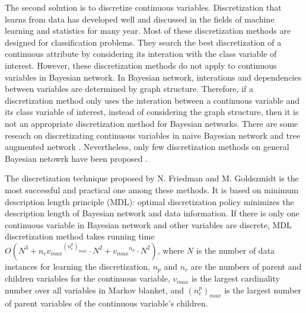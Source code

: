 The second solution is to discretize continuous variables. Discretization that learns from data has developed well and discussed \citep{Dougherty_1995} in the fields of machine learning and statistics for many year. Most of these discretization methods are designed for classification problems. They search the best discretization of a continuous attribute by considering its interation with the class variable of interest. However, these discretization methods do not apply to continuous variables in Bayesian network. In Bayesian network, interations and dependencies between variables are determined by graph structure. Therefore, if a discretization method only uses the interation between a continuous variable and its class variable of interest, instead of considering the graph structure, then it is not an appropriate discretization method for Bayesian networks. There are some reseach on discretizating continuous variables in naive Bayesian network and tree augmented network \citep{Fried_naive}. Nevertheless, only few discretization methods on general Bayesian netowrk have been proposed \citep{Friedman_1996, Kozlov_1997, Monti_1998}.

The discretization technique proposed by N. Friedman and M. Goldszmidt \citet{Friedman_1996} is the most successful and practical one among these methods. It is based on minimum description length principle (MDL): optimal discretization policy minimizes the description length of Bayesian network and data information. If there is only one continuous variable in Bayesian network and other variables are discrete, MDL discretization method takes running time $O(N^3 + n_c {v_{max}}^{(n_c^p)_{max}} \cdot N^2 + {v_{max}}^{n_p} \cdot N^2)$, where $N$ is the number of data instances for learning the discretization, $n_p$ and $n_c$ are the numbers of parent and children variables for the continuous variable, $v_{max}$ is the largest cardinality number over all variables in Markov blanket, and  ${(n_c^p)_{max}}$ is the largest number of parent variables of the continuous variable's children.


